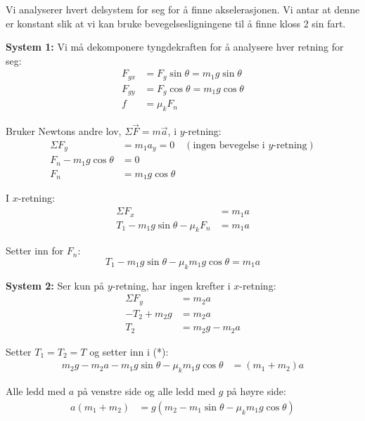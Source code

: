 \documentclass[answers,a4paper,12pt]{exam}
\begin{document}
\begin{questions}
\begin{parts}
\begin{solution}
Vi analyserer hvert delsystem for seg for å finne akselerasjonen. Vi antar at denne er konstant slik at vi kan bruke bevegelsesligningene til å finne kloss 2 sin fart.

\textbf{System 1:} Vi må dekomponere tyngdekraften for å analysere hver retning for seg:
\begin{align*}
    F_{g x} &= F_{g} \sin \theta = m_{1} g \sin \theta \\
    F_{g y} &= F_{g} \cos \theta = m_{1} g \cos \theta \\
    f &= \mu_{k} F_{n}
\end{align*}

Bruker Newtons andre lov, $\Sigma \vec{F} = m \vec{a}$, i $y$-retning:
\begin{align*}
    \Sigma F_{y} &= m_{1} a_{y} = 0 \quad (\text{ingen bevegelse i } y\text{-retning}) \\
    F_{n} - m_{1} g \cos \theta &= 0 \\
    F_{n} &= m_{1} g \cos \theta
\end{align*}

I $x$-retning:
\begin{align*}
    \Sigma F_{x} &= m_{1} a \\
    T_{1} - m_{1} g \sin \theta - \mu_{k} F_{n} &= m_{1} a
\end{align*}

Setter inn for $F_{n}$:
\begin{equation*}
    T_{1} - m_{1} g \sin \theta - \mu_{k} m_{1} g \cos \theta = m_{1} a \tag{*}
\end{equation*}

\textbf{System 2:} Ser kun på $y$-retning, har ingen krefter i $x$-retning:
\begin{align*}
    \Sigma F_{y} &= m_{2} a \\
    -T_{2} + m_{2} g &= m_{2} a \\
    T_{2} &= m_{2} g - m_{2} a
\end{align*}

Setter $T_{1} = T_{2} = T$ og setter inn i (*):
\begin{align*}
    m_{2} g - m_{2} a - m_{1} g \sin \theta - \mu_{k} m_{1} g \cos \theta &= (m_{1} + m_{2}) a
\end{align*}

Alle ledd med $a$ på venstre side og alle ledd med $g$ på høyre side:
\begin{align*}
    a(m_{1} + m_{2}) &= g(m_{2} - m_{1} \sin \theta - \mu_{k} m_{1} g \cos \theta)
\end{align*}


\end{solution}
\end{parts}
\end{questions}
\end{document}

